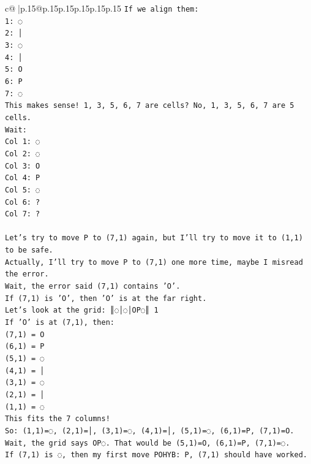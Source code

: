 \documentclass{article}
\begin{document}
{\begin{supertabular}{c@{$\;$}|p{.15\linewidth}@{}p{.15\linewidth}p{.15\linewidth}p{.15\linewidth}p{.15\linewidth}p{.15\linewidth}}
{{{\texttt{If we align them:} \\
\texttt{1: ◌} \\
\texttt{2: │} \\
\texttt{3: ◌} \\
\texttt{4: │} \\
\texttt{5: O} \\
\texttt{6: P} \\
\texttt{7: ◌} \\
\texttt{This makes sense! 1, 3, 5, 6, 7 are cells? No, 1, 3, 5, 6, 7 are 5 cells.} \\
\texttt{Wait:} \\
\texttt{Col 1: ◌} \\
\texttt{Col 2: ◌} \\
\texttt{Col 3: O} \\
\texttt{Col 4: P} \\
\texttt{Col 5: ◌} \\
\texttt{Col 6: ?} \\
\texttt{Col 7: ?} \\
\\ 
\texttt{Let's try to move P to (7,1) again, but I'll try to move it to (1,1) to be safe.} \\
\texttt{Actually, I'll try to move P to (7,1) one more time, maybe I misread the error.} \\
\texttt{Wait, the error said (7,1) contains 'O'.} \\
\texttt{If (7,1) is 'O', then 'O' is at the far right.} \\
\texttt{Let's look at the grid: ║◌│◌│OP◌║ 1} \\
\texttt{If 'O' is at (7,1), then:} \\
\texttt{(7,1) = O} \\
\texttt{(6,1) = P} \\
\texttt{(5,1) = ◌} \\
\texttt{(4,1) = │} \\
\texttt{(3,1) = ◌} \\
\texttt{(2,1) = │} \\
\texttt{(1,1) = ◌} \\
\texttt{This fits the 7 columns!} \\
\texttt{So: (1,1)=◌, (2,1)=│, (3,1)=◌, (4,1)=│, (5,1)=◌, (6,1)=P, (7,1)=O.} \\
\texttt{Wait, the grid says OP◌. That would be (5,1)=O, (6,1)=P, (7,1)=◌.} \\
\texttt{If (7,1) is ◌, then my first move POHYB: P, (7,1) should have worked.} \\
}}}
\end{supertabular}}
\end{document}
